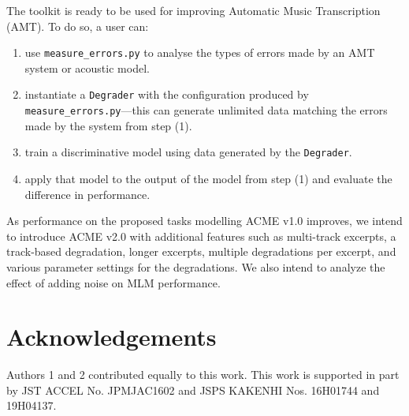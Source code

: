 \documentclass{article}
\begin{document}
The toolkit is ready to be used for improving Automatic Music Transcription (AMT). To do so, a user can:
\begin{enumerate}[nolistsep]
    \item use \texttt{\mbox{measure_errors.py}} to analyse the types of errors made by an AMT system or acoustic model.
    \item instantiate a \texttt{\mbox{Degrader}} with the configuration produced by \texttt{\mbox{measure_errors.py}}---this can generate unlimited data matching the errors made by the system from step (1).
    \item train a discriminative model using data generated by the \texttt{\mbox{Degrader}}.
    \item apply that model to the output of the model from step (1) and evaluate the difference in performance.
\end{enumerate}

As performance on the proposed tasks modelling ACME v1.0 improves, we intend to introduce ACME v2.0 with additional features such as multi-track excerpts, a track-based degradation, longer excerpts, multiple degradations per excerpt, and various parameter settings for the degradations. We also intend to analyze the effect of adding noise on MLM performance.


\section{Acknowledgements}
Authors 1 and 2 contributed equally to this work.
This work is supported in part by JST ACCEL No. JPMJAC1602 and JSPS KAKENHI Nos. 16H01744 and 19H04137.


\end{document}
